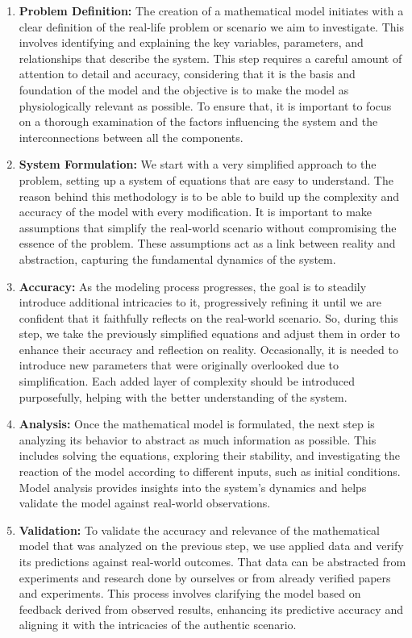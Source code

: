 \documentclass[class={myRUCProject}, crop=false]{standalone}
\begin{document}
\begin{enumerate}
    \item \textbf{Problem Definition:} The creation of a mathematical model initiates with a clear definition of the real-life problem or scenario we aim to investigate. This involves identifying and explaining the key variables, parameters, and relationships that describe the system. This step requires a careful amount of attention to detail and accuracy, considering that it is the basis and foundation of the model and the objective is to make the model as physiologically relevant as possible. To ensure that, it is important to focus on a thorough examination of the factors influencing the system and the interconnections between all the components. 
    \item \textbf{System Formulation:} We start with a very simplified approach to the problem, setting up a system of equations that are easy to understand. The reason behind this methodology is to be able to build up the complexity and accuracy of the model with every modification. It is important to make assumptions that simplify the real-world scenario without compromising the essence of the problem. These assumptions act as a link between reality and abstraction, capturing the fundamental dynamics of the system.
    \item \textbf{Accuracy:} As the modeling process progresses, the goal is to steadily introduce additional intricacies to it, progressively refining it until we are confident that it faithfully reflects on the real-world scenario. So, during this step, we take the previously simplified equations and adjust them in order to enhance their accuracy and reflection on reality. Occasionally, it is needed to introduce new parameters that were originally overlooked due to simplification. Each added layer of complexity should be introduced purposefully, helping with the better understanding of the system.
    \item \textbf{Analysis:} Once the mathematical model is formulated, the next step is analyzing its behavior to abstract as much information as possible. This includes solving the equations, exploring their stability, and investigating the reaction of the model according to different inputs, such as initial conditions. Model analysis provides insights into the system's dynamics and helps validate the model against real-world observations.
   \item \textbf{Validation:} To validate the accuracy and relevance of the mathematical model that was analyzed on the previous step, we use applied data and verify its predictions against real-world outcomes. That data can be abstracted from experiments and research done by ourselves or from already verified papers and experiments. This process involves clarifying the model based on feedback derived from observed results, enhancing its predictive accuracy and aligning it with the intricacies of the authentic scenario. 

\end{enumerate}
\end{document}
